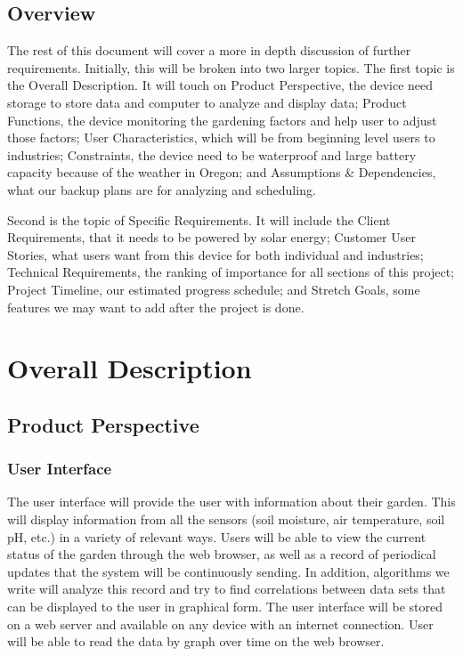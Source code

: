 \documentclass[IEEEtran,letterpaper,10pt,titlepage,fleqn,draftclsnofoot,onecolumn]{article}
\begin{document}
\subsection{Overview}

The rest of this document will cover a more in depth discussion of further requirements. Initially, this will be broken into two larger topics. The first topic is the Overall Description. It will touch on Product Perspective, the device need storage to store data and computer to analyze and display data; Product Functions, the device monitoring the gardening factors and help user to adjust those factors; User Characteristics, which will be from beginning level users to industries; Constraints, the device need to be waterproof and large battery capacity because of the weather in Oregon; and Assumptions \& Dependencies, what our backup plans are for analyzing and scheduling.

\vspace{5mm}

Second is the topic of Specific Requirements. It will include the Client Requirements, that it needs to be powered by solar energy; Customer User Stories, what users want from this device for both individual and industries; Technical Requirements, the ranking of importance for all sections of this project; Project Timeline, our estimated progress schedule; and Stretch Goals, some features we may want to add after the project is done. 

\section{Overall Description}
\subsection{Product Perspective}
\subsubsection{User Interface}

The user interface will provide the user with information about their garden. This will display information from all the sensors (soil moisture, air temperature, soil pH, etc.) in a variety of relevant ways. Users will be able to view the current status of the garden through the web browser, as well as a record of periodical updates that the system will be continuously sending. In addition, algorithms we write will analyze this record and try to find correlations between data sets that can be displayed to the user in graphical form. The user interface will be stored on a web server and available on any device with an internet connection. User will be able to read the data by graph over time on the web browser.
\end{document}
